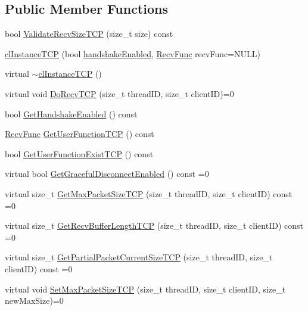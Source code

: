 \subsection*{Public Member Functions}
\begin{DoxyCompactItemize}
\item 
bool \hyperlink{classcl_instance_t_c_p_a20b988c8482d363c8761e8f347e78f1e}{ValidateRecvSizeTCP} (size\_\-t size) const 
\item 
\hyperlink{classcl_instance_t_c_p_a4b9ba11655513ad84c19b3b8a21567e7}{clInstanceTCP} (bool \hyperlink{classcl_instance_t_c_p_a4a35647e926d2c2c5abec877242f69fa}{handshakeEnabled}, \hyperlink{classcl_instance_core_afa96c2a2c0b26b6a9256b87798bf9587}{RecvFunc} recvFunc=NULL)
\item 
virtual \hyperlink{classcl_instance_t_c_p_ab841d8e7bb49c48b3b57b3804e454cc9}{$\sim$clInstanceTCP} ()
\item 
virtual void \hyperlink{classcl_instance_t_c_p_a680fdd73e7ea21c59da3029f30ab9409}{DoRecvTCP} (size\_\-t threadID, size\_\-t clientID)=0
\item 
bool \hyperlink{classcl_instance_t_c_p_a8900daedc98164438e26383a0001cc22}{GetHandshakeEnabled} () const 
\item 
\hyperlink{classcl_instance_core_afa96c2a2c0b26b6a9256b87798bf9587}{RecvFunc} \hyperlink{classcl_instance_t_c_p_a535b2bebcd899467da153f156ca5c78b}{GetUserFunctionTCP} () const 
\item 
bool \hyperlink{classcl_instance_t_c_p_a37c65c52f6fc37b2eeab22e3b74961c3}{GetUserFunctionExistTCP} () const 
\item 
virtual bool \hyperlink{classcl_instance_t_c_p_aad5a5af8e7fa2b973dc7b3ae6ba82dd4}{GetGracefulDisconnectEnabled} () const =0
\item 
virtual size\_\-t \hyperlink{classcl_instance_t_c_p_a50e7cc70cb2e6e8a717c8f8fb6b4f21a}{GetMaxPacketSizeTCP} (size\_\-t threadID, size\_\-t clientID) const =0
\item 
virtual size\_\-t \hyperlink{classcl_instance_t_c_p_ac813fb12b20efbae4b5ea266309bfa85}{GetRecvBufferLengthTCP} (size\_\-t threadID, size\_\-t clientID) const =0
\item 
virtual size\_\-t \hyperlink{classcl_instance_t_c_p_aafa9f7579aaf64c135d0a386da496e07}{GetPartialPacketCurrentSizeTCP} (size\_\-t threadID, size\_\-t clientID) const =0
\item 
virtual void \hyperlink{classcl_instance_t_c_p_a614c842749f0dadca9da9aa825323c2e}{SetMaxPacketSizeTCP} (size\_\-t threadID, size\_\-t clientID, size\_\-t newMaxSize)=0

\end{DoxyCompactItemize}
